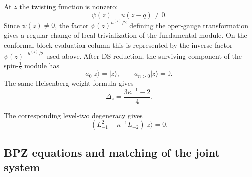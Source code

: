 \documentclass[a4paper,11pt]{article}
\numberwithin{equation}{section}
\begin{document}
At $z$ the twisting function is nonzero:
\begin{equation}
	\psi(z)=u(z-q)\neq0.
\end{equation}
Since $\psi(z)\neq 0$, the factor $\psi(z)^{h^{(z)}/2}$ defining the oper-gauge transformation gives a regular change of local trivialization of the fundamental module.  On the conformal-block evaluation column this is represented by the inverse factor $\psi(z)^{-h^{(z)}/2}$ used above.  After DS reduction, the surviving component of the spin-$\frac{1}{2}$ module has
\begin{equation}
	a_{0}|z\rangle
	=
	|z\rangle,
	\qquad
	a_{n>0}|z\rangle=0.
\end{equation}
The same Heisenberg weight formula gives
\begin{equation}
	\label{equation:z conformal weight from spin module}
	\Delta_{z}
	=
	\frac{3\kappa^{-1}-2}{4}.
\end{equation}

The corresponding level-two degeneracy gives
\begin{equation}
	\label{equation:z null vector}
	\left(
	L_{-1}^{2}-\kappa^{-1}L_{-2}
	\right)|z\rangle=0.
\end{equation}

\subsection{BPZ equations and matching of the joint system}
\label{sec:BPZ operators}
\end{document}
